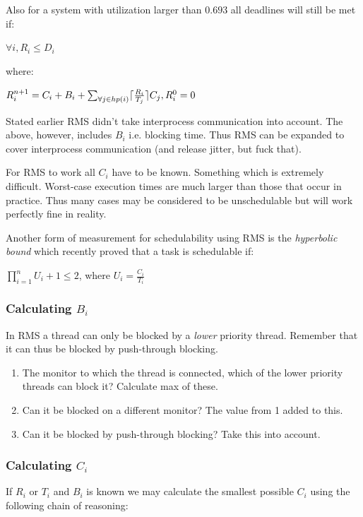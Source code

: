 \documentclass[a4paper]{article}
\DeclarePairedDelimiter{\ceil}{\lceil}{\rceil}
\begin{document}
Also for a system with utilization larger than $0.693$ all deadlines will still
be met if:

\begin{center}
  $\forall i, R_i \leq D_i$
\end{center}
where:
\begin{center}
  $R_i^{n+1} = C_i + B_i + \sum_{\forall j \in hp(i)} \ceil{\frac{R_i}{T_j}} C_j, R_i^0 = 0$
\end{center}

Stated earlier RMS didn't take interprocess communication into account. The above,
however, includes $B_i$ i.e. blocking time. Thus RMS can be expanded to cover
interprocess communication (and release jitter, but fuck that).

For RMS to work all $C_i$ have to be known. Something which is extremely difficult.
Worst-case execution times are much larger than those that occur in practice.
Thus many cases may be considered to be unschedulable but will work perfectly fine
in reality.

Another form of measurement for schedulability using RMS is the \emph{hyperbolic bound}
which recently proved that a task is schedulable if:

\begin{center}
  $\prod_{i=1}^{n} U_i + 1 \leq 2$, where $U_i = \frac{C_i}{T_i}$
\end{center}


\subsubsection{Calculating $B_i$}
In RMS a thread can only be blocked by a \emph{lower} priority thread. Remember that
it can thus be blocked by push-through blocking.

\begin{enumerate}
  \item The monitor to which the thread is connected, which of the lower
        priority threads can block it? Calculate max of these.
  \item Can it be blocked on a different monitor? The value from 1 added to this.
  \item Can it be blocked by push-through blocking? Take this into account.
\end{enumerate}

\subsubsection{Calculating $C_i$}
If $R_i$ or $T_i$ and $B_i$ is known we may calculate the smallest possible $C_i$
using the following chain of reasoning: \\
\end{document}
